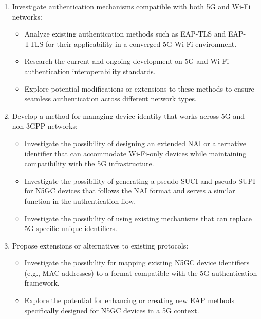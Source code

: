 \begin{enumerate}
    \item{
        Investigate authentication mechanisms compatible with both \ac{5G} and Wi-Fi networks:
        \begin{itemize}
            \item {
                Analyze existing authentication methods such as \ac{EAP-TLS} and \ac{EAP-TTLS} for their applicability in a converged \ac{5G}-Wi-Fi environment.
            }
            \item {
                Research the current and ongoing development on \ac{5G} and Wi-Fi authentication interoperability standards.
            }
            \item {
                Explore potential modifications or extensions to these methods to ensure seamless authentication across different network types.
            }
        \end{itemize}
    }
    \item{
        Develop a method for managing device identity that works across \ac{5G} and non-\ac{3GPP} networks:
        \begin{itemize}
            \item Investigate the possibility of designing an extended \ac{NAI} or alternative identifier that can accommodate Wi-Fi-only devices while maintaining compatibility with the \ac{5G} infrastructure.
            
            \item Investigate the possibility of generating a pseudo-\ac{SUCI} and pseudo-\ac{SUPI} for \ac{N5GC} devices that follows the \ac{NAI} format and serves a similar function in the authentication flow.

            \item Investigate the possibility of using existing mechanisms that can replace \ac{5G}-specific unique identifiers.
        \end{itemize}
    }
    \item{
        Propose extensions or alternatives to existing protocols:
        \begin{itemize}
            \item Investigate the possibility for mapping existing \ac{N5GC} device identifiers (e.g., \ac{MAC} addresses) to a format compatible with the \ac{5G} authentication framework.
            \item Explore the potential for enhancing or creating new \ac{EAP} methods specifically designed for \ac{N5GC} devices in a \ac{5G} context.
        \end{itemize}
    }
\end{enumerate}

